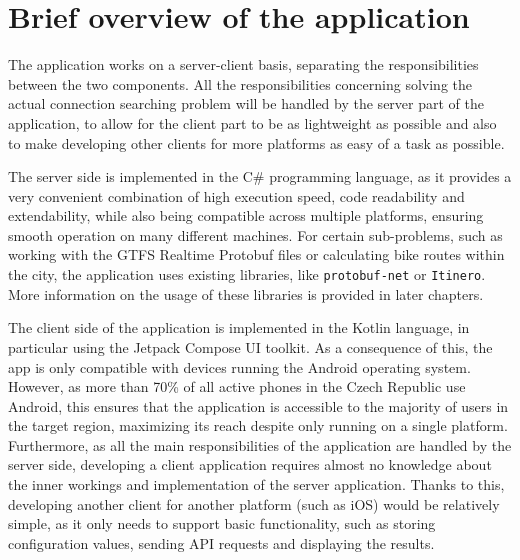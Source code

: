 \section{Brief overview of the application}
\label{subsec:overview_of_app}

The application works on a server-client basis, separating the responsibilities between the two components. All the responsibilities concerning solving the actual connection searching problem will be handled by the server part of the application, to allow for the client part to be as lightweight as possible and also to make developing other clients for more platforms as easy of a task as possible.

The server side is implemented in the C\# programming language, as it provides a very convenient combination of high execution speed, code readability and extendability, while also being compatible across multiple platforms, ensuring smooth operation on many different machines. For certain sub-problems, such as working with the GTFS Realtime Protobuf files or calculating bike routes within the city, the application uses existing libraries, like \texttt{protobuf-net} or \texttt{Itinero}. More information on the usage of these libraries is provided in later chapters.

The client side of the application is implemented in the Kotlin language, in particular using the Jetpack Compose UI toolkit. As a consequence of this, the app is only compatible with devices running the Android operating system. However, as more than 70\% of all active phones in the Czech Republic use Android\cite{statista_mobile_os}, this ensures that the application is accessible to the majority of users in the target region, maximizing its reach despite only running on a single platform. Furthermore, as all the main responsibilities of the application are handled by the server side, developing a client application requires almost no knowledge about the inner workings and implementation of the server application. Thanks to this, developing another client for another platform (such as iOS) would be relatively simple, as it only needs to support basic functionality, such as storing configuration values, sending API requests and displaying the results.

